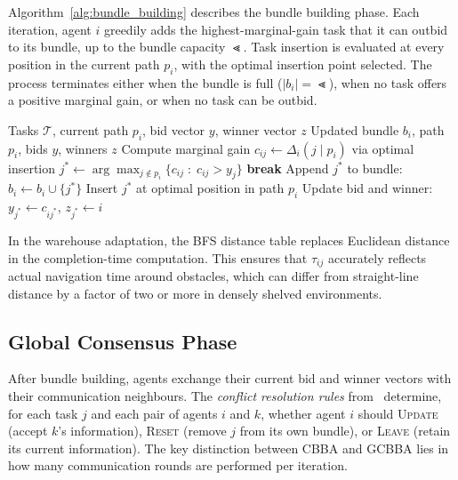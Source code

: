 Algorithm~\ref{alg:bundle_building} describes the bundle building phase.
Each iteration, agent $i$ greedily adds the highest-marginal-gain task that it
can outbid to its bundle, up to the bundle capacity $\Lt$.
Task insertion is evaluated at every position in the current path $p_i$, with
the optimal insertion point selected.
The process terminates either when the bundle is full ($|b_i| = \Lt$), when no
task offers a positive marginal gain, or when no task can be outbid.

\begin{algorithm}[htbp]
\caption{GCBBA Bundle Building (agent $i$)}
\label{alg:bundle_building}
\begin{algorithmic}[1]
\Require Tasks $\mathcal{T}$, current path $p_i$, bid vector $y$, winner vector $z$
\Ensure Updated bundle $b_i$, path $p_i$, bids $y$, winners $z$
    \State Compute marginal gain $c_{ij} \leftarrow \Delta_i(j \mid p_i)$ via optimal insertion
  \EndFor
  \State $j^* \leftarrow \arg\max_{j \notin p_i} \bigl\{c_{ij} \;:\; c_{ij} > y_j\bigr\}$
   \textbf{break} \EndIf
  \State Append $j^*$ to bundle: $b_i \leftarrow b_i \cup \{j^*\}$
  \State Insert $j^*$ at optimal position in path $p_i$
  \State Update bid and winner: $y_{j^*} \leftarrow c_{ij^*}$,\; $z_{j^*} \leftarrow i$
\EndWhile
\end{algorithmic}
\end{algorithm}

In the warehouse adaptation, the BFS distance table replaces Euclidean distance
in the completion-time computation.
This ensures that $\tau_{ij}$ accurately reflects actual navigation time around
obstacles, which can differ from straight-line distance by a factor of two or
more in densely shelved environments.


\subsection{Global Consensus Phase}
\label{subsec:method_consensus}

After bundle building, agents exchange their current bid and winner vectors with
their communication neighbours.
The \emph{conflict resolution rules} from~\cite{choi2009consensus,kha2025enhancing}
determine, for each task $j$ and each pair of agents $i$ and $k$, whether
agent $i$ should \textsc{Update} (accept $k$'s information), \textsc{Reset}
(remove $j$ from its own bundle), or \textsc{Leave} (retain its current
information).
The key distinction between CBBA and GCBBA lies in how many communication
rounds are performed per iteration.

